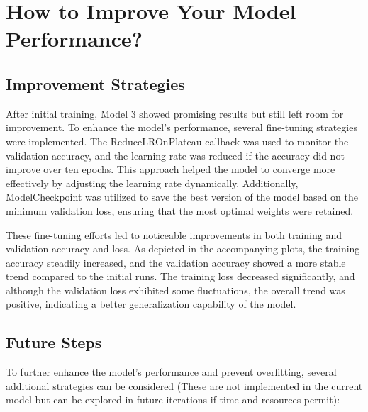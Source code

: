\chapter{How to Improve Your Model Performance?}

\section{Improvement Strategies}
\label{sec:chap4 section 1}

After initial training, Model 3 showed promising results but still left room for improvement. To enhance the model's performance, several fine-tuning strategies were implemented. The ReduceLROnPlateau callback was used to monitor the validation accuracy, and the learning rate was reduced if the accuracy did not improve over ten epochs. This approach helped the model to converge more effectively by adjusting the learning rate dynamically. Additionally, ModelCheckpoint was utilized to save the best version of the model based on the minimum validation loss, ensuring that the most optimal weights were retained.

These fine-tuning efforts led to noticeable improvements in both training and validation accuracy and loss. As depicted in the accompanying plots, the training accuracy steadily increased, and the validation accuracy showed a more stable trend compared to the initial runs. The training loss decreased significantly, and although the validation loss exhibited some fluctuations, the overall trend was positive, indicating a better generalization capability of the model.


\section{Future Steps}
\label{sec:chap4 section 2}

To further enhance the model's performance and prevent overfitting, several additional strategies can be considered (These are not implemented in the current model but can be explored in future iterations if time and resources permit):

